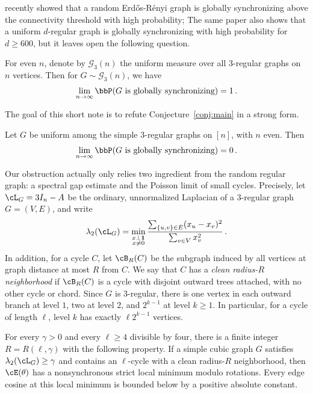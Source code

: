 \documentclass[11pt,reqno]{amsart}
\begin{document}
\cite{abdalla2026expander} recently showed that a random Erd\H{o}s-R\'enyi graph is globally synchronizing above the connectivity threshold with high probability; The same paper also shows that a uniform $d$-regular graph is globally synchronizing with high probability for $d \ge 600$, but it leaves open the following question.
\begin{conj}{\label{conj:main}}
    For even $n$, denote by $\mathcal G_3(n)$ the uniform measure over all $3$-regular graphs on $n$ vertices. Then for $G \sim \mathcal G_3(n)$, we have 
    \begin{align*}
        \lim_{n \to\infty} \bbP(G \textup{ is globally synchronizing}) =1 \,.
    \end{align*}
\end{conj}
The goal of this short note is to refute Conjecture~\ref{conj:main} in a strong form.
\begin{thm}\label{thm:main}
    Let $G$ be uniform among the simple $3$-regular graphs on $[n]$, with $n$ even. Then
    \[
    \lim_{n \to\infty} \bbP(G \textup{ is globally synchronizing}) = 0 \,.
    \]
\end{thm}
Our obstruction actually only relies two ingredient from the random regular graph: a spectral gap estimate and the Poisson limit of small cycles. Precisely, let $\cL_G=3I_n-A$ be the ordinary, unnormalized Laplacian of a $3$-regular graph $G=(V,E)$, and write
\begin{equation}{\label{eq:second-eigen}}
    \lambda_2(\cL_G)=\min_{\substack{x\perp\mathbf 1\\x\ne0}} \frac{\sum_{\{u,v\}\in E}(x_u-x_v)^2}{\sum_{v\in V}x_v^2} \,.
\end{equation}
In addition, for a cycle $C$, let $\cB_R(C)$ be the subgraph induced by all vertices at graph distance at most $R$ from $C$. We say that $C$ has a \emph{clean radius-$R$ neighborhood} if $\cB_R(C)$ is a cycle with disjoint outward trees attached, with no other cycle or chord. Since $G$ is $3$-regular, there is one vertex in each outward branch at level $1$, two at level $2$, and $2^{k-1}$ at level $k\ge1$. In particular, for a cycle of length $\ell$, level $k$ has exactly $\ell2^{k-1}$ vertices.
\begin{prop}\label{prop:obstruction}
For every $\gamma>0$ and every $\ell\ge4$ divisible by four, there is a finite integer $R=R(\ell,\gamma)$ with the following property. If a simple cubic graph $G$ satisfies $\lambda_2(\cL_G)\ge\gamma$ and contains an $\ell$-cycle with a clean radius-$R$ neighborhood, then $\cE(\theta)$ has a nonsynchronous strict local minimum modulo rotations. Every edge cosine at this local minimum is bounded below by a positive absolute constant.
\end{prop}
\end{document}
